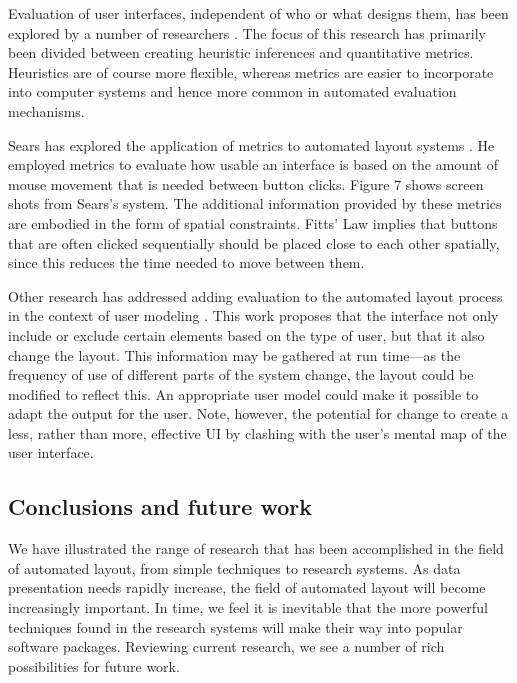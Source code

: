     Evaluation of user interfaces, independent of who or what designs them, has
    been explored by a number of researchers
    \citep{tullis-1,sears-1,sears-3,comver-1,jeffries-1}. The focus of this
    research has primarily been divided between creating heuristic inferences
    and quantitative metrics. Heuristics are of course more flexible, whereas
    metrics are easier to incorporate into computer systems and hence more
    common in automated evaluation mechanisms.

    Sears has explored the application of metrics to automated layout systems
    \citep{sears-2}. He employed metrics to evaluate how usable an interface is
    based on the amount of mouse movement that is needed between button clicks.
    Figure 7 shows screen shots from Sears’s system. The additional information
    provided by these metrics are embodied in the form of spatial constraints.
    Fitts’ Law \citep{mackenzie-1} implies that buttons that are often clicked
    sequentially should be placed close to each other spatially, since this
    reduces the time needed to move between them.

    Other research has addressed adding evaluation to the automated layout
    process in the context of user modeling \citep{schlungbaum-1}. This work
    proposes that the interface not only include or exclude certain elements
    based on the type of user, but that it also change the layout. This
    information may be gathered at run time—as the frequency of use of
    different parts of the system change, the layout could be modified to
    reflect this. An appropriate user model could make it possible to adapt the
    output for the user. Note, however, the potential for change to create a
    less, rather than more, effective UI by clashing with the user’s mental map
    of the user interface.

   \subsection{Conclusions and future work}
    \label{conclusions-layout-paper}

    We have illustrated the range of research that has been accomplished in the
    field of automated layout, from simple techniques to research systems. As
    data presentation needs rapidly increase, the field of automated layout
    will become increasingly important. In time, we feel it is inevitable that
    the more powerful techniques found in the research systems will make their
    way into popular software packages. Reviewing current research, we see a
    number of rich possibilities for future work.


